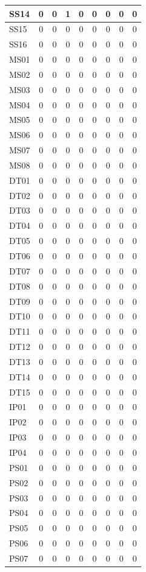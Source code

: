 \documentclass [10pt]{article}
\begin{document}
\begin{longtable}{ | p{} | c | c | c | c | c | c | c | c | }
	SS14 & 0 & 0 & 1 & 0 & 0 & 0 & 0 & 0 \\ \hline
	SS15 & 0 & 0 & 0 & 0 & 0 & 0 & 0 & 0 \\ \hline
	SS16 & 0 & 0 & 0 & 0 & 0 & 0 & 0 & 0 \\ \hline
	MS01 & 0 & 0 & 0 & 0 & 0 & 0 & 0 & 0 \\ \hline
	MS02 & 0 & 0 & 0 & 0 & 0 & 0 & 0 & 0 \\ \hline
	MS03 & 0 & 0 & 0 & 0 & 0 & 0 & 0 & 0 \\ \hline
	MS04 & 0 & 0 & 0 & 0 & 0 & 0 & 0 & 0 \\ \hline
	MS05 & 0 & 0 & 0 & 0 & 0 & 0 & 0 & 0 \\ \hline
	MS06 & 0 & 0 & 0 & 0 & 0 & 0 & 0 & 0 \\ \hline
	MS07 & 0 & 0 & 0 & 0 & 0 & 0 & 0 & 0 \\ \hline
	MS08 & 0 & 0 & 0 & 0 & 0 & 0 & 0 & 0 \\ \hline
	DT01 & 0 & 0 & 0 & 0 & 0 & 0 & 0 & 0 \\ \hline
	DT02 & 0 & 0 & 0 & 0 & 0 & 0 & 0 & 0 \\ \hline
	DT03 & 0 & 0 & 0 & 0 & 0 & 0 & 0 & 0 \\ \hline
	DT04 & 0 & 0 & 0 & 0 & 0 & 0 & 0 & 0 \\ \hline
	DT05 & 0 & 0 & 0 & 0 & 0 & 0 & 0 & 0 \\ \hline
	DT06 & 0 & 0 & 0 & 0 & 0 & 0 & 0 & 0 \\ \hline
	DT07 & 0 & 0 & 0 & 0 & 0 & 0 & 0 & 0 \\ \hline
	DT08 & 0 & 0 & 0 & 0 & 0 & 0 & 0 & 0 \\ \hline
	DT09 & 0 & 0 & 0 & 0 & 0 & 0 & 0 & 0 \\ \hline
	DT10 & 0 & 0 & 0 & 0 & 0 & 0 & 0 & 0 \\ \hline
	DT11 & 0 & 0 & 0 & 0 & 0 & 0 & 0 & 0 \\ \hline
	DT12 & 0 & 0 & 0 & 0 & 0 & 0 & 0 & 0 \\ \hline
	DT13 & 0 & 0 & 0 & 0 & 0 & 0 & 0 & 0 \\ \hline
	DT14 & 0 & 0 & 0 & 0 & 0 & 0 & 0 & 0 \\ \hline
	DT15 & 0 & 0 & 0 & 0 & 0 & 0 & 0 & 0 \\ \hline
	IP01 & 0 & 0 & 0 & 0 & 0 & 0 & 0 & 0 \\ \hline
	IP02 & 0 & 0 & 0 & 0 & 0 & 0 & 0 & 0 \\ \hline
	IP03 & 0 & 0 & 0 & 0 & 0 & 0 & 0 & 0 \\ \hline
	IP04 & 0 & 0 & 0 & 0 & 0 & 0 & 0 & 0 \\ \hline
	PS01 & 0 & 0 & 0 & 0 & 0 & 0 & 0 & 0 \\ \hline
	PS02 & 0 & 0 & 0 & 0 & 0 & 0 & 0 & 0 \\ \hline
	PS03 & 0 & 0 & 0 & 0 & 0 & 0 & 0 & 0 \\ \hline
	PS04 & 0 & 0 & 0 & 0 & 0 & 0 & 0 & 0 \\ \hline
	PS05 & 0 & 0 & 0 & 0 & 0 & 0 & 0 & 0 \\ \hline
	PS06 & 0 & 0 & 0 & 0 & 0 & 0 & 0 & 0 \\ \hline
	PS07 & 0 & 0 & 0 & 0 & 0 & 0 & 0 & 0 \\ \hline
\end{longtable}
\end{document}
